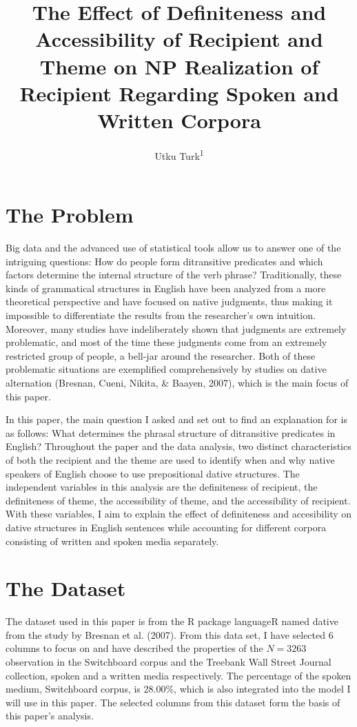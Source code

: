 \documentclass[english,floatsintext,man]{apa6}
\title{The Effect of Definiteness and Accessibility of Recipient and Theme on
NP Realization of Recipient Regarding Spoken and Written Corpora}
\author{Utku Turk\textsuperscript{1}}
\affiliation{
    \vspace{0.5cm}
          \textsuperscript{1} Department of Linguistics, Boğaziçi University  }
\theoremstyle{definition}
\theoremstyle{definition}
\theoremstyle{definition}
\theoremstyle{remark}
\begin{document}
\maketitle

\setcounter{secnumdepth}{0}



\section{The Problem}\label{the-problem}

Big data and the advanced use of statistical tools allow us to answer
one of the intriguing questions: How do people form ditransitive
predicates and which factors determine the internal structure of the
verb phrase? Traditionally, these kinds of grammatical structures in
English have been analyzed from a more theoretical perspective and have
focused on native judgments, thus making it impossible to differentiate
the results from the researcher's own intuition. Moreover, many studies
have indeliberately shown that judgments are extremely problematic, and
most of the time these judgments come from an extremely restricted group
of people, a bell-jar around the researcher. Both of these problematic
situations are exemplified comprehensively by studies on dative
alternation (Bresnan, Cueni, Nikita, \& Baayen, 2007), which is the main
focus of this paper.

In this paper, the main question I asked and set out to find an
explanation for is as follows: What determines the phrasal structure of
ditransitive predicates in English? Throughout the paper and the data
analysis, two distinct characteristics of both the recipient and the
theme are used to identify when and why native speakers of English
choose to use prepositional dative structures. The independent variables
in this analysis are the definiteness of recipient, the definiteness of
theme, the accessibility of theme, and the accessibility of recipient.
With these variables, I aim to explain the effect of definiteness and
accesibility on dative structures in English sentences while accounting
for different corpora consisting of written and spoken media separately.

\section{The Dataset}\label{the-dataset}

The dataset used in this paper is from the R package languageR named
dative from the study by Bresnan et al. (2007). From this data set, I
have selected 6 columns to focus on and have described the properties of
the \(N = 3263\) observation in the Switchboard corpus and the Treebank
Wall Street Journal collection, spoken and a written media respectively.
The percentage of the spoken medium, Switchboard corpus, is 28.00\%,
which is also integrated into the model I will use in this paper. The
selected columns from this dataset form the basis of this paper's
analysis.
\end{document}
